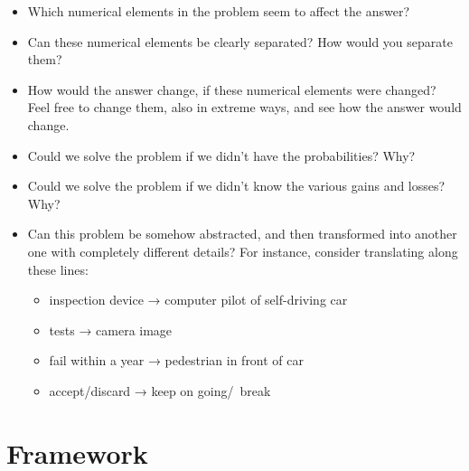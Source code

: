 \documentclass[
  a4paper,
  DIV=11,
  numbers=noendperiod,
  oneside]{scrreprt}
\providecommand{\tightlist}{%
  \setlength{\itemsep}{0pt}\setlength{\parskip}{0pt}}\usepackage{longtable,booktabs,array}
\begin{document}
\begin{itemize}
\item
  Which numerical elements in the problem seem to affect the answer?
\item
  Can these numerical elements be clearly separated? How would you
  separate them?
\item
  How would the answer change, if these numerical elements were changed?
  Feel free to change them, also in extreme ways, and see how the answer
  would change.
\item
  Could we solve the problem if we didn't have the probabilities? Why?
\item
  Could we solve the problem if we didn't know the various gains and
  losses? Why?
\item
  Can this problem be somehow abstracted, and then transformed into
  another one with completely different details? For instance, consider
  translating along these lines:

  \begin{itemize}
  \tightlist
  \item
    inspection device → computer pilot of self-driving car
  \item
    tests → camera image
  \item
    fail within a year → pedestrian in front of car
  \item
    accept/discard → keep on going/~break
  \end{itemize}
\end{itemize}

\hypertarget{framework}{%
\chapter{Framework}\label{framework}}

\providecommand{\ul}{\uline}
\renewcommand*{\|}[1][]{\nonscript\:#1\vert\nonscript\:\mathopen{}}
\providecommand*{\pr}[1]{\textsf{\small`#1'}}
\renewcommand*{\pr}[1]{\textsf{\small`#1'}}
\providecommand*{\prq}[1]{\textsf{\small #1}}
\renewcommand*{\prq}[1]{\textsf{\small #1}}
\providecommand{\se}[1]{\mathsfit{#1}}
\renewcommand{\se}[1]{\mathsfit{#1}}
\providecommand{\p}{\mathrm{p}}
\renewcommand{\p}{\mathrm{p}}
\renewcommand{\P}{\mathrm{P}}
\end{document}
